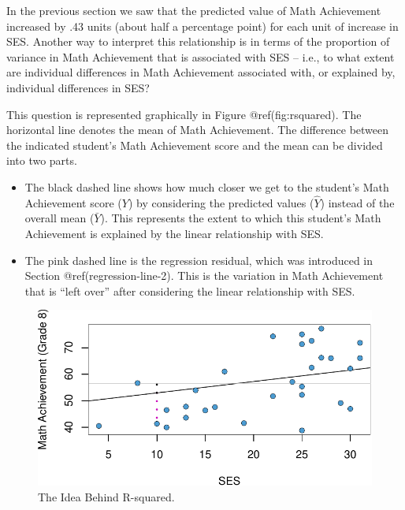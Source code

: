 \documentclass[
  letterpaper,
  DIV=11,
  numbers=noendperiod]{scrreprt}
\begin{document}
In the previous section we saw that the predicted value of Math
Achievement increased by .43 units (about half a percentage point) for
each unit of increase in SES. Another way to interpret this relationship
is in terms of the proportion of variance in Math Achievement that is
associated with SES -- i.e., to what extent are individual differences
in Math Achievement associated with, or explained by, individual
differences in SES?

This question is represented graphically in Figure @ref(fig:rsquared).
The horizontal line denotes the mean of Math Achievement. The difference
between the indicated student's Math Achievement score and the mean can
be divided into two parts.

\begin{itemize}
\item
  The black dashed line shows how much closer we get to the student's
  Math Achievement score (\(Y\)) by considering the predicted values
  (\(\widehat Y\)) instead of the overall mean (\(\bar Y\)). This
  represents the extent to which this student's Math Achievement is
  explained by the linear relationship with SES.
\item
  The pink dashed line is the regression residual, which was introduced
  in Section @ref(regression-line-2). This is the variation in Math
  Achievement that is ``left over'' after considering the linear
  relationship with SES.
\end{itemize}

\begin{figure}

{\centering \includegraphics{ch2_simple_regression_files/figure-pdf/rsquared-1.pdf}

}

\caption{The Idea Behind R-squared.}

\end{figure}
\end{document}
